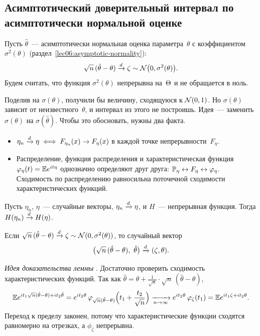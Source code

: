 \subsection{Асимптотический доверительный интервал по асимптотически нормальной оценке}
\label{lec08:asymptotic}

Пусть $\hat\theta$~--- асимптотически нормальная оценка параметра~$\theta$ с коэффициентом
$\sigma^2(\theta)$ (раздел~\ref{lec06:asymptotic-normality}):
\[
  \sqrt{n}\,(\hat\theta - \theta) \tod \zeta \sim \Norm\bigl(0, \sigma^2(\theta)\bigr).
\]
Будем считать, что функция $\sigma^2(\theta)$ непрерывна на~$\Th$ и не обращается в ноль.

Поделив на $\sigma(\theta)$, получили бы величину, сходящуюся к $\Norm(0, 1)$. Но $\sigma(\theta)$
зависит от неизвестного~$\theta$, и интервал из этого не построишь. Идея~--- заменить
$\sigma(\theta)$ на $\sigma(\hat\theta)$. Чтобы это обосновать, нужны два факта.

\begin{reminder}
  \begin{itemize}
    \item $\eta_n \tod \eta \iff F_{\eta_n}(x) \to F_\eta(x)$ в каждой точке непрерывности~$F_\eta$.
    \item Распределение, функция распределения и характеристическая функция
          $\phi_\eta(t) = \E e^{it\eta}$ однозначно определяют друг друга:
          $\P_\eta \leftrightarrow F_\eta \leftrightarrow \phi_\eta$. Сходимость по распределению
          равносильна поточечной сходимости характеристических функций.
  \end{itemize}
\end{reminder}

\begin{theorem}[о непрерывности]
  \label{lec08:continuity}
  Пусть $\eta_n$, $\eta$~--- случайные векторы, $\eta_n \tod \eta$, и $H$~--- непрерывная функция.
  Тогда $H(\eta_n) \tod H(\eta)$.
\end{theorem}

\begin{lemma}
  \label{lec08:joint}
  Если $\sqrt{n}\,(\hat\theta - \theta) \tod \zeta \sim \Norm(0, \sigma^2(\theta))$, то случайный вектор
  \[
    \bigl(\sqrt{n}\,(\hat\theta - \theta),\ \hat\theta\bigr) \tod (\zeta, \theta).
  \]
\end{lemma}

\begin{addendum}
  \emph{Идея доказательства леммы} \cite[гл.~16, лемма~1.1]{bure}. Достаточно проверить
  сходимость характеристических функций. Так как
  $\hat\theta = \theta + \frac{1}{\sqrt n} \cdot \sqrt{n}\,(\hat\theta - \theta)$,
  \[
    \E e^{i t_1 \sqrt{n}(\hat\theta - \theta) + i t_2 \hat\theta}
    = e^{i t_2 \theta}\, \phi_{\sqrt{n}(\hat\theta - \theta)}\Bigl(t_1 + \frac{t_2}{\sqrt n}\Bigr)
    \xrightarrow[n \to \infty]{} e^{i t_2 \theta}\, \phi_\zeta(t_1) = \E e^{i t_1 \zeta + i t_2 \theta}.
  \]
  Переход к пределу законен, потому что характеристические функции сходятся равномерно на
  отрезках, а $\phi_\zeta$ непрерывна.
\end{addendum}

